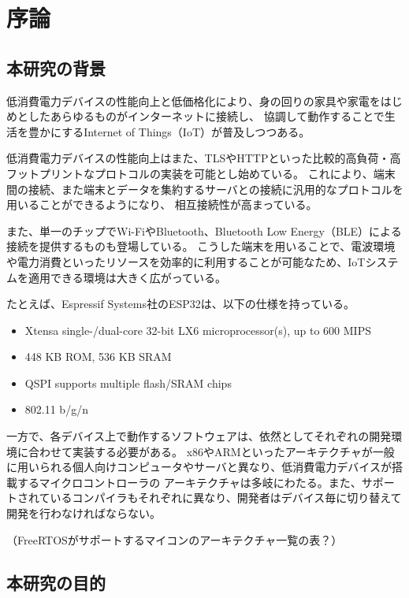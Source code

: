 \chapter{序論}
\label{chap:introduction}

\section{本研究の背景}

低消費電力デバイスの性能向上と低価格化により、身の回りの家具や家電をはじめとしたあらゆるものがインターネットに接続し、
協調して動作することで生活を豊かにするInternet of Things（IoT）が普及しつつある。

低消費電力デバイスの性能向上はまた、TLSやHTTPといった比較的高負荷・高フットプリントなプロトコルの実装を可能とし始めている。
これにより、端末間の接続、また端末とデータを集約するサーバとの接続に汎用的なプロトコルを用いることができるようになり、
相互接続性が高まっている。

また、単一のチップでWi-FiやBluetooth、Bluetooth Low Energy（BLE）による接続を提供するものも登場している。
こうした端末を用いることで、電波環境や電力消費といったリソースを効率的に利用することが可能なため、IoTシステムを適用できる環境は大きく広がっている。

たとえば、Espressif Systems社のESP32\cite{esp32}は、以下の仕様を持っている。

\begin{itemize}
  \item Xtensa single-/dual-core 32-bit LX6 microprocessor(s), up to 600 MIPS
  \item 448 KB ROM, 536 KB SRAM
  \item QSPI supports multiple flash/SRAM chips
  \item 802.11 b/g/n
\end{itemize}


一方で、各デバイス上で動作するソフトウェアは、依然としてそれぞれの開発環境に合わせて実装する必要がある。
x86やARMといったアーキテクチャが一般に用いられる個人向けコンピュータやサーバと異なり、低消費電力デバイスが搭載するマイクロコントローラの
アーキテクチャは多岐にわたる。また、サポートされているコンパイラもそれぞれに異なり、開発者はデバイス毎に切り替えて開発を行わなければならない。

（FreeRTOSがサポートするマイコンのアーキテクチャ一覧の表？）

\section{本研究の目的}


